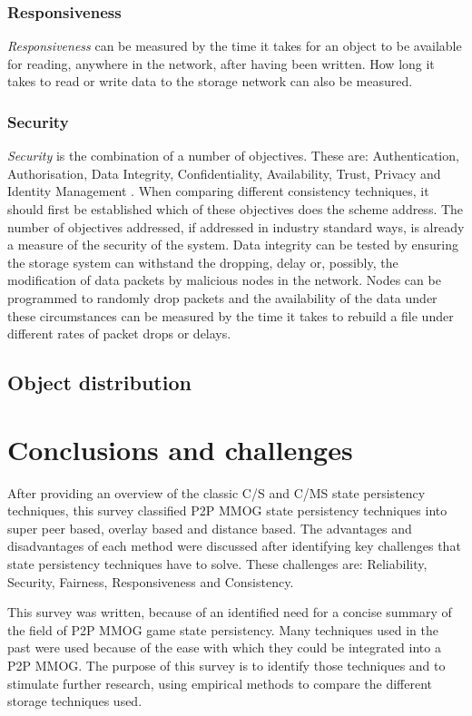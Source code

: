 \documentclass[10pt,a4paper,journal,cspaper,compsoc]{IEEEtran}
\begin{document}
\subsubsection{Responsiveness}
\emph{Responsiveness} can be measured by the time it takes for an object to be available for reading, anywhere in the network, after having been
written. How long it takes to read or write data to the storage network can also be measured.

\subsubsection{Security}
\emph{Security} is the combination of a number of objectives. These are: Authentication, Authorisation, Data Integrity, Confidentiality,
Availability, Trust, Privacy and Identity Management \cite{distributed_systems_security}. When comparing different consistency techniques, it should
first be established which of these objectives does the scheme address. The number of objectives addressed, if addressed in industry standard ways,
is already a measure of the security of the system. Data integrity can be tested by ensuring the storage system can withstand the dropping, delay or,
possibly, the modification of data packets by malicious nodes in the network. Nodes can be programmed to randomly drop packets and the availability
of the data under these circumstances can be measured by the time it takes to rebuild a file under different rates of packet drops or delays.

\subsection{Object distribution}

\section{Conclusions and challenges}


After providing an overview of the classic C/S and C/MS state persistency techniques, this survey classified P2P MMOG state persistency techniques
into super peer based, overlay based and distance based. The advantages and disadvantages of each method were discussed after identifying key
challenges that state persistency techniques have to solve. These challenges are: Reliability, Security, Fairness, Responsiveness and Consistency.

This survey was written, because of an identified need for a concise summary of the field of P2P MMOG game state persistency. Many techniques used in
the past were used because of the ease with which they could be integrated into a P2P MMOG. The purpose of this survey is to identify those
techniques and to stimulate further research, using empirical methods to compare the different storage techniques used.


{} %



\end{document}

